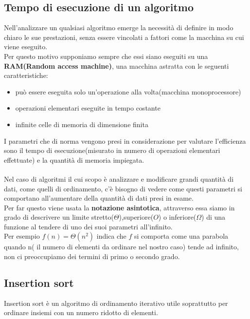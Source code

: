 \documentclass[]{article}
\begin{document}
\subsection{Tempo di esecuzione di un algoritmo}
Nell'analizzare un qualsiasi algoritmo emerge la necessità di definire in modo chiaro le sue prestazioni, senza essere vincolati a fattori come la macchina su cui viene eseguito.\\ Per questo motivo supponiamo sempre che essi siano eseguiti su una \textbf{RAM(Random access machine)}, una macchina astratta con le seguenti caratteristiche:
\begin{itemize}
\item può essere eseguita solo un'operazione alla volta(macchina monoprocessore)
\item operazioni elementari eseguite in tempo costante
\item infinite celle di memoria di dimensione finita
\end{itemize}
I parametri che di norma vengono presi in considerazione per valutare l'efficienza sono il tempo di esecuzione(misurato in numero di operazioni elementari effettuate) e la quantità di memoria impiegata.\\
\\
Nel caso di algoritmi il cui scopo è analizzare e modificare grandi quantità di dati, come quelli di ordinamento, c'è bisogno di vedere come questi parametri si comportano all'aumentare della quantità di dati presi in esame.\\
Per far questo viene usata la \textbf{notazione asintotica}, attraverso essa siamo in grado di descrivere un limite stretto($\Theta$),superiore($O$) o inferiore($\Omega$) di una funzione al tendere di uno dei suoi parametri all'infinito.\\
Per esempio $f(n) = \Theta(n^2)$ indica che $f$ si comporta come una parabola quando n( il numero di elementi da ordinare nel nostro caso) tende ad infinito, non ci preoccupiamo dei termini di primo o secondo grado.

\newpage
\subsection{Insertion sort}
Insertion sort è un algoritmo di ordinamento iterativo utile soprattutto per ordinare insiemi con un numero ridotto di elementi.
\end{document}
